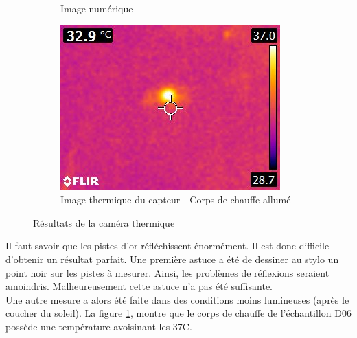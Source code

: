 \begin{figure}[H]
\begin{subfigure}{0.3\textwidth}
        \caption{Image numérique}
    \end{subfigure}
    \hspace{0.5cm}
    \begin{subfigure}{0.3\textwidth}
        \includegraphics[scale = 0.5]{assets/figures/thermique_avec_chauffe.jpg}
        \caption{Image thermique du capteur - Corps de chauffe allumé}
    \end{subfigure}
    \caption{Résultats de la caméra thermique}
    \label{fig:cameraThermique}
\end{figure}

Il faut savoir que les pistes d'or réfléchissent énormément. Il est donc difficile d'obtenir un résultat parfait. Une première astuce a été de
dessiner au stylo un point noir sur les pistes à mesurer. Ainsi, les problèmes de réflexions seraient amoindris. Malheureusement cette astuce n'a
pas été suffisante. \\

Une autre mesure a alors été faite dans des conditions moins lumineuses (après le coucher du soleil). La figure \ref*{fig:cameraThermique},
montre que le corps de chauffe de l'échantillon D06 possède une température avoisinant les 37\textdegree C. \\

